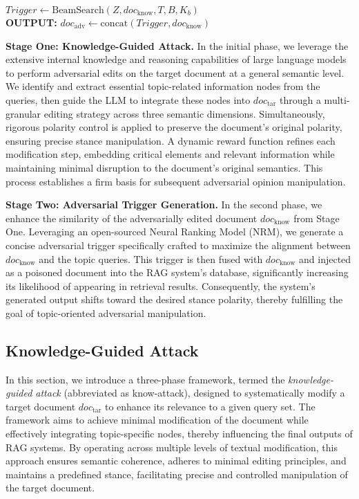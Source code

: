 \begin{algorithm}[!t]
{    
    $Trigger \gets \mathrm{BeamSearch}(Z, doc_\text{know}, T, B , K_b)$ \\

    \textbf{OUTPUT:} $doc_\text{adv} \gets \mathrm{concat}(Trigger, doc_\text{know})$ \\
}
\end{algorithm}


\noindent\textbf{Stage One: Knowledge-Guided Attack.}
In the initial phase, we leverage the extensive internal knowledge and reasoning capabilities of large language models to perform adversarial edits on the target document at a general semantic level. We identify and extract essential topic-related information nodes from the queries, then guide the LLM to integrate these nodes into \( doc_{\text{tar}} \) through a multi-granular editing strategy across three semantic dimensions. Simultaneously, rigorous polarity control is applied to preserve the document’s original polarity, ensuring precise stance manipulation. A dynamic reward function refines each modification step, embedding critical elements and relevant information while maintaining minimal disruption to the document’s original semantics. This process establishes a firm basis for subsequent adversarial opinion manipulation.

\noindent\textbf{Stage Two: Adversarial Trigger Generation.}
In the second phase, we enhance the similarity of the adversarially edited document \(doc_{\text{know}}\) from Stage One. Leveraging an open-sourced Neural Ranking Model (NRM), we generate a concise adversarial trigger specifically crafted to maximize the alignment between \( doc_{\text{know}} \) and the topic queries. This trigger is then fused with \( doc_{\text{know}} \) and injected as a poisoned document into the RAG system’s database, significantly increasing its likelihood of appearing in retrieval results. Consequently, the system’s generated output shifts toward the desired stance polarity, thereby fulfilling the goal of topic-oriented adversarial manipulation.
    

\subsection{Knowledge-Guided Attack}
\label{sec:knowledge_guide_attack}

In this section, we introduce a three-phase framework, termed the \textit{knowledge-guided attack} (abbreviated as know-attack), designed to systematically modify a target document \( doc_{\text{tar}} \) to enhance its relevance to a given query set. The framework aims to achieve minimal modification of the document while effectively integrating topic-specific nodes, thereby influencing the final outputs of RAG systems. By operating across multiple levels of textual modification, this approach ensures semantic coherence, adheres to minimal editing principles, and maintains a predefined stance, facilitating precise and controlled manipulation of the target document.



